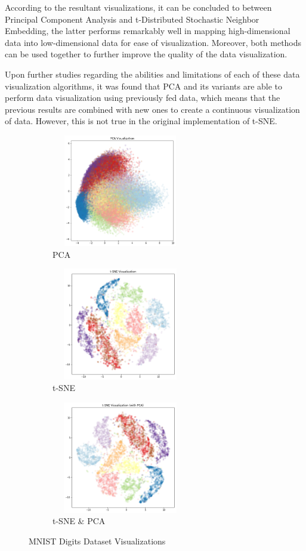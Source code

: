 \documentclass[twocolumn]{article}
\begin{document}
According to the resultant visualizations, it can be concluded to between Principal Component
Analysis and t-Distributed Stochastic Neighbor Embedding, the latter performs remarkably well in
mapping high-dimensional data into low-dimensional data for ease of visualization. Moreover, both
methods can be used together to further improve the quality of the data visualization.

Upon further studies regarding the abilities and limitations of each of these data visualization
algorithms, it was found that PCA and its variants are able to perform data visualization using
previously fed data, which means that the previous results are combined with new ones to create a
continuous visualization of data. However, this is not true in the original implementation of t-SNE.

\begin{figure}[t!]
  \centering
  \begin{subfigure}[t]{0.5\textwidth}
    \centering
    \includegraphics[width=6cm, height=4.9cm]{pca.png}
    \caption{PCA}
  \end{subfigure}
  \begin{subfigure}[t]{0.5\textwidth}
    \centering
    \includegraphics[width=6cm, height=4.9cm]{tsne.png}
    \caption{t-SNE}
  \end{subfigure}
  \begin{subfigure}[t]{0.5\textwidth}
    \centering
    \includegraphics[width=6cm, height=4.9cm]{tsne_with_pca.png}
    \caption{t-SNE \& PCA}
  \end{subfigure}
  \caption{MNIST Digits Dataset Visualizations}
  \label{fig:comparison}
\end{figure}



\end{document}
